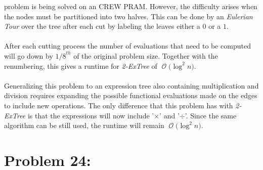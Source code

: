 \documentclass[12pt]{article}
\newcommand{\BigO}[1]{\ensuremath{\operatorname{\mathcal{O}}\bigl(#1\bigr)}}
\begin{document}
problem is being solved on an CREW PRAM\@.  However, the difficulty
arises when the nodes must be partitioned into two halves.  This
can be done by an \textit{Eulerian Tour} over the tree after
each cut by labeling the leaves either a $0$ or a $1$.\\\\
After each cutting process the number of evaluations that
need to be computed will go down by ${1/8}^{th}$ of the original
problem size.  Together with the renumbering, this gives a runtime
for \textit{2-ExTree} of \BigO{\log^2 n}.\\\\
Generalizing this problem to an expression tree also containing
multiplication and division requires expanding the possible functional
evaluations made on the edges to include new operations.  The only
difference that this problem has with \textit{2-ExTree} is that the
expressions will now include '$\times$' and '$\div$'.  Since the
same algorithm can be still used, the runtime will remain \BigO{\log^2 n}.   
\section*{Problem 24: }
\end{document}
